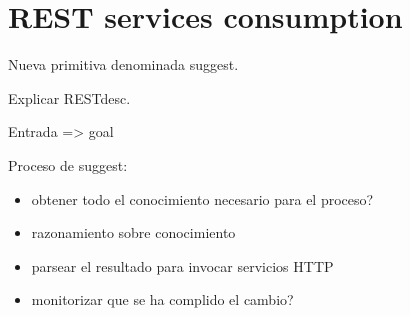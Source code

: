 
\section{REST services consumption}








Nueva primitiva denominada suggest.

Explicar RESTdesc.

Entrada => goal

Proceso de suggest:

\begin{itemize}
 \item obtener todo el conocimiento necesario para el proceso?
 \item razonamiento sobre conocimiento
 \item parsear el resultado para invocar servicios HTTP
 \item monitorizar que se ha complido el cambio?
\end{itemize}